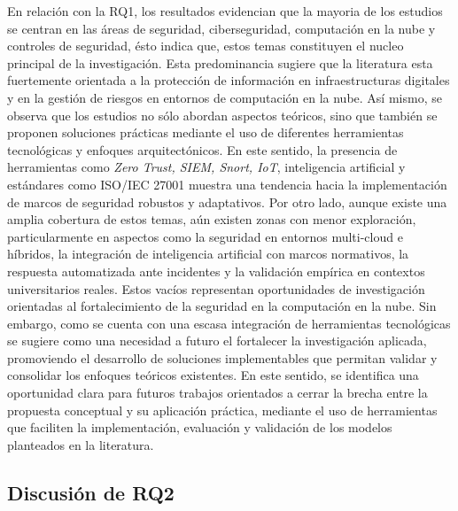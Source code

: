 En relación con la RQ1, los resultados evidencian que la mayoria de los estudios se centran en las áreas de seguridad, ciberseguridad, 
computación en la nube y controles de seguridad, ésto indica que, estos temas constituyen el nucleo principal de la investigación. 
Esta predominancia sugiere que la literatura esta fuertemente orientada a la protección de información en infraestructuras digitales y en 
la gestión de riesgos en entornos de computación en la nube. Así mismo, se observa que los estudios no sólo abordan aspectos teóricos, 
sino que también se proponen soluciones prácticas mediante el uso de diferentes herramientas tecnológicas y enfoques arquitectónicos. 
En este sentido, la presencia de herramientas como \textit{Zero Trust, SIEM, Snort, IoT}, inteligencia artificial y estándares como ISO/IEC 27001 
muestra una tendencia hacia la implementación de marcos de seguridad robustos y adaptativos. Por otro lado, aunque existe una amplia 
cobertura de estos temas, aún existen zonas con menor exploración, particularmente en aspectos como la seguridad en entornos 
multi-cloud e híbridos, la integración de inteligencia artificial con marcos normativos, la respuesta automatizada ante incidentes 
y la validación empírica en contextos universitarios reales. Estos vacíos representan oportunidades de investigación orientadas al 
fortalecimiento de la seguridad en la computación en la nube. Sin embargo, como se cuenta con una escasa integración de herramientas 
tecnológicas se sugiere como una necesidad a futuro el fortalecer la investigación aplicada, promoviendo el desarrollo de soluciones 
implementables que permitan validar y consolidar los enfoques teóricos existentes. En este sentido, se identifica una oportunidad 
clara para futuros trabajos orientados a cerrar la brecha entre la propuesta conceptual y su aplicación práctica, mediante el uso de 
herramientas que faciliten la implementación, evaluación y validación de los modelos planteados en la literatura.

\subsection{Discusión de RQ2}

